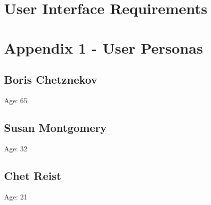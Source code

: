 \documentclass[a4paper,12pt]{article}
\begin{document}
\section*{User Interface Requirements}

\newpage 
\section*{Appendix 1 - User Personas}
\subsection*{Boris Chetznekov}
Age: 65
\subsection*{Susan Montgomery}
Age: 32
\subsection*{Chet Reist}
Age: 21
\end{document}
